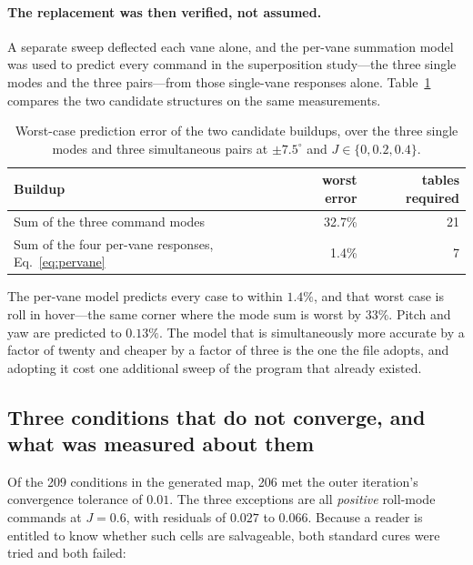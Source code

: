 \documentclass[11pt,a4paper]{article}
\newcommand{\dg}{^\circ}
\begin{document}
\paragraph{The replacement was then verified, not assumed.} A separate
sweep deflected each vane alone, and the per-vane summation model was
used to predict every command in the superposition study---the three
single modes and the three pairs---from those single-vane responses
alone. Table~\ref{tab:pervane} compares the two candidate structures on
the same measurements.

\begin{table}[htbp]
\centering
\caption{Worst-case prediction error of the two candidate buildups,
over the three single modes and three simultaneous pairs at
$\pm 7.5\dg$ and $J \in \{0, 0.2, 0.4\}$.}
\label{tab:pervane}
\begin{tabular}{@{}lrr@{}}
\toprule
Buildup & worst error & tables required \\
\midrule
Sum of the three command modes & 32.7\% & 21 \\
Sum of the four per-vane responses, Eq.~\eqref{eq:pervane} & 1.4\% & 7 \\
\bottomrule
\end{tabular}
\end{table}

The per-vane model predicts every case to within $1.4\%$, and that worst
case is roll in hover---the same corner where the mode sum is worst by
$33\%$. Pitch and yaw are predicted to $0.13\%$. The model that is
simultaneously more accurate by a factor of twenty and cheaper by a
factor of three is the one the file adopts, and adopting it cost one
additional sweep of the program that already existed.

\subsection{Three conditions that do not converge, and what was measured
about them}
\label{sec:nonconv}

Of the 209 conditions in the generated map, 206 met the outer iteration's
convergence tolerance of $0.01$. The three exceptions are all
\emph{positive} roll-mode commands at $J = 0.6$, with residuals of
$0.027$ to $0.066$. Because a reader is entitled to know whether such
cells are salvageable, both standard cures were tried and both failed:
\end{document}
